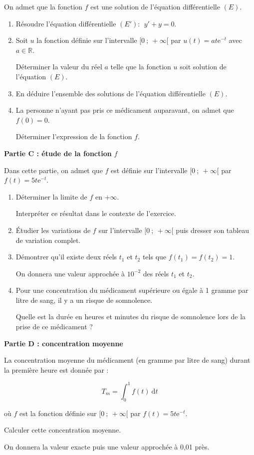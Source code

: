 \documentclass[10pt]{article}
\providecommand{\R}{\mathbb{R}}
\providecommand{\e}{{\mathrm{e}}}
\begin{document}
On admet que la fonction $f$ est une solution de l'équation différentielle $(E)$.

\medskip

\begin{enumerate}
\item Résoudre l'équation différentielle $(E') : \:\: y' + y = 0$.
\item Soit $u$ la fonction définie sur l’intervalle $[0~;~ +\infty[$ par $u(t) = at\e^{-t}$ avec $a \in \R$.

Déterminer la valeur du réel $a$ telle que la fonction $u$ soit solution de l'équation $(E)$.
\item En déduire l'ensemble des solutions de l'équation différentielle $(E)$.
\item La personne n'ayant pas pris ce médicament auparavant, on admet que $f(0) = 0$.

Déterminer l'expression de la fonction $f$.
\end{enumerate}

\medskip

\textbf{Partie C : étude de la fonction} \boldmath $f$ \unboldmath

\medskip

Dans cette partie, on admet que $f$ est définie sur l'intervalle $[0~;~+\infty[$ par $f(t) = 5t \e^{-t}$.

\medskip

\begin{enumerate}
\item Déterminer la limite de $f$ en $+\infty$.

Interpréter ce résultat dans le contexte de l'exercice.
\item Étudier les variations de $f$ sur l'intervalle $[0~;~ +\infty[$ puis dresser son tableau de variation complet.
\item Démontrer qu’il existe deux réels $t_1$ et $t_2$ tels que $f\left(t_1\right) = f\left(t_2\right) = 1$.

On donnera une valeur approchée à $10^{-2}$ des réels $t_1$ et $t_2$.
\item Pour une concentration du médicament supérieure ou égale à 1 gramme par litre de sang, il y a un risque de somnolence.

Quelle est la durée en heures et minutes du risque de somnolence lors de la prise de ce médicament ?
\end{enumerate}

\medskip

\textbf{Partie D : concentration moyenne}

\medskip

La concentration moyenne du médicament (en gramme par litre de sang) durant la première heure est donnée par :

\[T_m = \displaystyle\int_0^1 f(t) \:\text{d}t\]

où $f$ est la fonction définie sur $[0~;~+\infty[$ par $f(t) = 5t\e^{-t}$.

Calculer cette concentration moyenne.

On donnera la valeur exacte puis une valeur approchée à 0,01 près.

\bigskip
\end{document}
